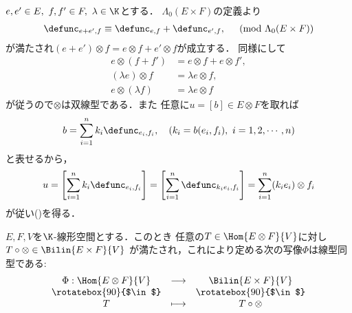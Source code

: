 	\begin{prf}
		$e,e' \in E,\ f,f' \in F,\ \lambda \in \K$とする．
		$\Lambda_0(E \times F)$の定義より
		\begin{align}
			\defunc_{e+e',f} \equiv \defunc_{e,f}+\defunc_{e',f},
			\quad \pmod{\Lambda_0(E \times F)}
		\end{align}
		が満たされ$(e + e') \otimes f = e \otimes f + e' \otimes f$が成立する．
		同様にして
		\begin{align}
			e \otimes (f+f') &= e \otimes f + e \otimes f', \\
			(\lambda e) \otimes f &= \lambda e \otimes f, \\
			e \otimes (\lambda f) &= \lambda e \otimes f
		\end{align}
		が従うので$\otimes$は双線型である．また
		任意に$u = [b] \in E \otimes F$を取れば
		\begin{align}
			b = \sum_{i=1}^n k_i \defunc_{e_i,f_i},
			\quad \left( k_i = b(e_i,f_i),\ i=1,2,\cdots,n \right)
		\end{align}
		と表せるから，
		\begin{align}
			u = \left[ \sum_{i=1}^n k_i \defunc_{e_i,f_i} \right]
			= \left[ \sum_{i=1}^n \defunc_{k_i e_i,f_i} \right]
			= \sum_{i=1}^n (k_i e_i) \otimes f_i
		\end{align}
		が従い()を得る．
		\QED
	\end{prf}
	
	\begin{screen}
		\begin{thm}[普遍性]\label{thm:university_of_tensor_product}
			$E,F,V$を$\K$-線形空間とする．このとき
			任意の$T \in \Hom{E \otimes F}{V}$に対し
			$T \circ \otimes \in \Bilin{E \times F}{V}$
			が満たされ，これにより定める次の写像$\Phi$は線型同型である:
			\begin{align}
				\begin{array}{ccc}
					\Phi:\Hom{E \otimes F}{V} & \longrightarrow & \Bilin{E \times F}{V} \\
					\rotatebox{90}{$\in$} & & \rotatebox{90}{$\in$} \\
					T & \longmapsto & T \circ \otimes \label{eq:thm_university_of_tensor_product}
				\end{array}
			\end{align}
		\end{thm}
	\end{screen}
	
